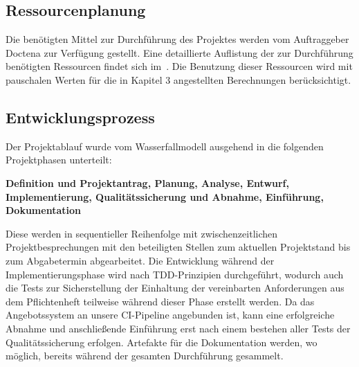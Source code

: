 \subsection{Ressourcenplanung}
\label{sec:Ressourcenplanung}

Die benötigten Mittel zur Durchführung des Projektes werden vom Auftraggeber Doctena zur Verfügung gestellt. Eine detaillierte Auflistung der zur Durchführung benötigten Ressourcen findet sich im~. Die Benutzung dieser Ressourcen wird mit pauschalen Werten für die in Kapitel 3 angestellten Berechnungen berücksichtigt.

\subsection{Entwicklungsprozess}
\label{sec:Entwicklungsprozess}
Der Projektablauf wurde vom Wasserfallmodell ausgehend in die folgenden Projektphasen unterteilt:

\textbf{Definition und Projektantrag, Planung, Analyse, Entwurf, Implementierung, Qualitätssicherung und Abnahme, Einführung, Dokumentation}

Diese werden in sequentieller Reihenfolge mit zwischenzeitlichen Projektbesprechungen mit den beteiligten Stellen zum aktuellen Projektstand bis zum Abgabetermin abgearbeitet. Die Entwicklung während der Implementierungsphase wird nach \ac{TDD}-Prinzipien durchgeführt, wodurch auch die Tests zur Sicherstellung der Einhaltung der vereinbarten Anforderungen aus dem Pflichtenheft teilweise während dieser Phase erstellt werden. Da das Angebotssystem an unsere \ac{CI}-Pipeline angebunden ist, kann eine erfolgreiche Abnahme und anschließende Einführung erst nach einem bestehen aller Tests der Qualitätssicherung erfolgen. Artefakte für die Dokumentation werden, wo möglich, bereits während der gesamten Durchführung gesammelt.
